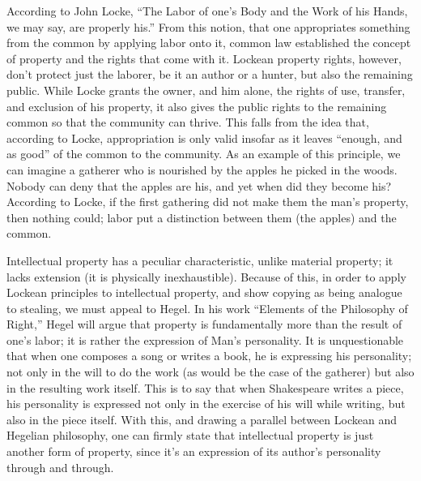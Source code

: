 \documentclass[12pt,letterpaper]{article}
\begin{document}
According to John Locke, ``The Labor of one's Body and the Work of his Hands, we may say, are properly his.''\autocite[\ppno~287]{locke-1988} From this notion, that one appropriates something from the common by applying labor onto it, common law established the concept of property and the rights that come with it. Lockean property rights, however, don't protect just the laborer, be it an author or a hunter, but also the remaining public. While Locke grants the owner, and him alone, the rights of
use, transfer, and exclusion of his property, it also gives the public rights to the remaining common so that the community can thrive.\autocite[\ppno~119]{favale-2014} This falls from the idea that, according to Locke, appropriation is only valid insofar as it leaves ``enough, and as good''\autocite[\ppno~291]{locke-1988} of the common to the community. As an example of this principle, we can imagine a gatherer who is nourished by the apples he picked in the woods. Nobody can deny that the
apples are his, and yet when did they become his? According to Locke, if the first gathering did not make them the man's property, then nothing could; labor put a distinction between them (the apples) and the common.\autocite[\ppno~288]{locke-1988}

Intellectual property has a peculiar characteristic, unlike material property; it lacks extension (it is physically inexhaustible). Because of this, in order to apply Lockean principles to intellectual property, and show copying as being analogue to stealing, we must appeal to Hegel. In his work ``Elements of the Philosophy of Right,'' Hegel will argue that property is fundamentally more than the result of one's labor; it is rather the expression of Man's personality\autocite[\ppno~84--88]{hegel-1991}. It is unquestionable that when one composes a song or writes a book, he is expressing his personality; not only in the will to do the work (as would be the case of the gatherer) but also in the resulting work itself. This is to say that when Shakespeare writes a piece, his personality is expressed not only in the exercise of his will while writing, but also in the piece itself. With this, and drawing a parallel between Lockean and Hegelian philosophy, one can firmly state that intellectual property is just another form of property, since it's an expression of its author's personality through and through.
\end{document}
